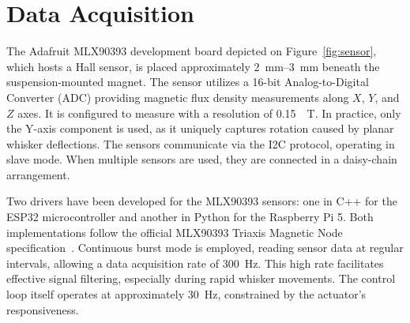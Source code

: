 \section{Data Acquisition}

The Adafruit MLX90393 development board depicted on Figure~\ref{fig:sensor}, which hosts a Hall sensor, is placed approximately \qtyrange{2}{3}{\milli\metre} beneath the suspension-mounted magnet.
The sensor utilizes a 16-bit Analog-to-Digital Converter (ADC) providing magnetic flux density measurements along $X$, $Y$, and $Z$ axes.
It is configured to measure with a resolution of \SI{0.15}{\mu\tesla}.
In practice, only the Y-axis component is used, as it uniquely captures rotation caused by planar whisker deflections.
The sensors communicate via the I2C protocol, operating in slave mode.
When multiple sensors are used, they are connected in a daisy-chain arrangement.

Two drivers have been developed for the MLX90393 sensors: one in C++ for the ESP32 microcontroller and another in Python for the Raspberry Pi 5.
Both implementations follow the official MLX90393 Triaxis Magnetic Node specification~\cite{MLX90393}.
Continuous burst mode is employed, reading sensor data at regular intervals, allowing a data acquisition rate of \SI{300}{\hertz}.
This high rate facilitates effective signal filtering, especially during rapid whisker movements.
The control loop itself operates at approximately \SI{30}{\hertz}, constrained by the actuator’s responsiveness.

